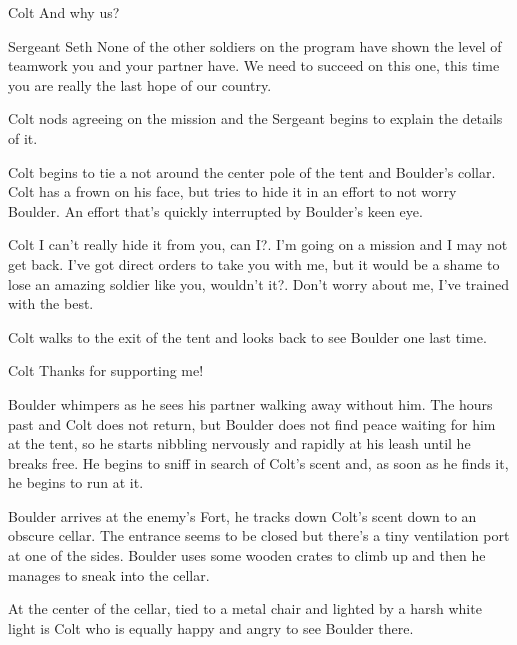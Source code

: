 \documentclass{screenplay}[2012/06/30]
\begin{document}
\begin{dialogue}{Colt}
    And why us?
\end{dialogue}

\begin{dialogue}{Sergeant Seth}
    None of the other soldiers on the program
    have shown the level of 
    teamwork you and your partner have.
    We need to succeed on this one, this time you are
    really the last hope of our country.  
\end{dialogue}

Colt nods agreeing on the mission and the Sergeant begins 
to explain the details of it.

Colt begins to tie a not around the center pole of the 
tent and Boulder's collar. Colt has a frown on his face,
but tries to hide it in an effort to not worry Boulder.
An effort that's quickly interrupted by Boulder's keen eye.

\begin{dialogue}[Sad]{Colt}
    I can't really hide it from you, can I?. I'm going on
    a mission and I may not get back. I've got direct orders
    to take you with me, but it would be a shame to lose an 
    amazing soldier like you, wouldn't it?. Don't worry 
    about me, I've trained with the best.
\end{dialogue}

Colt walks to the exit of the tent and looks back to see
Boulder one last time.
\begin{dialogue}{Colt}
    Thanks for supporting me!
\end{dialogue}

Boulder whimpers as he sees his partner
walking away without him. The hours past and Colt does not 
return, but Boulder does not find peace waiting for him at 
the tent, so he starts nibbling nervously and rapidly at 
his leash until he breaks free. He begins to sniff in search 
of Colt's scent and, as soon as he finds it, he begins to run
at it.

Boulder arrives at the enemy's Fort, he tracks down Colt's 
scent down to an obscure cellar. The entrance seems to be 
closed but there's a tiny ventilation port at one of the sides. 
Boulder uses some wooden crates to climb up and then he manages 
to sneak into the cellar.

At the center of the cellar, tied to a metal chair and 
lighted by a harsh white light is Colt who is equally 
happy and angry to see Boulder there.
\end{document}
